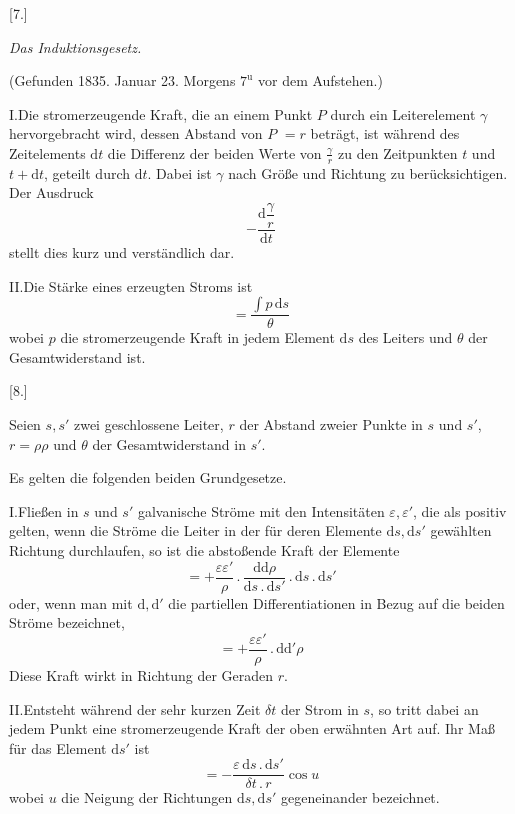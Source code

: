 \begin{center}[7.]\par\medskip\textit{Das Induktionsgesetz.}\par\medskip
{\small (Gefunden 1835. Januar 23. Morgens $7^{\mathrm u}$ vor dem Aufstehen.)}
\end{center}
I.\quad Die stromerzeugende Kraft, die an einem Punkt $P$ durch ein Leiterelement $\gamma$ hervorgebracht wird, dessen Abstand von $P$ $=r$ beträgt, ist während des Zeitelements $\mathrm dt$ die Differenz der beiden Werte von $\frac{\gamma}{r}$ zu den Zeitpunkten $t$ und $t+\mathrm dt$, geteilt durch $\mathrm dt$. Dabei ist $\gamma$ nach Größe und Richtung zu berücksichtigen. Der Ausdruck
\[
-\frac{\mathrm d\dfrac{\gamma}{r}}{\mathrm dt}
\]
stellt dies kurz und verständlich dar.

II.\quad Die Stärke eines erzeugten Stroms ist
\[
=\frac{\int p\,\mathrm ds}{\theta}
\]
wobei $p$ die stromerzeugende Kraft in jedem Element $\mathrm ds$ des Leiters und $\theta$ der Gesamtwiderstand ist.

\begin{center}[8.]\end{center}
Seien $s,s'$ zwei geschlossene Leiter, $r$ der Abstand zweier Punkte in $s$ und $s'$, $r=\rho\rho$ und $\theta$ der Gesamtwiderstand in $s'$.

Es gelten die folgenden beiden Grundgesetze.

I.\quad Fließen in $s$ und $s'$ galvanische Ströme mit den Intensitäten $\varepsilon,\varepsilon'$, die als positiv gelten, wenn die Ströme die Leiter in der für deren Elemente $\mathrm ds,\mathrm ds'$ gewählten Richtung durchlaufen, so ist die abstoßende Kraft der Elemente
\[
=+\frac{\varepsilon\varepsilon'}{\rho}\,.\,\frac{\mathrm d\mathrm d\rho}{\mathrm ds\,.\,\mathrm ds'}\,.\,\mathrm ds\,.\,\mathrm ds'
\]
oder, wenn man mit $\mathrm d,\mathrm d'$ die partiellen Differentiationen in Bezug auf die beiden Ströme bezeichnet,
\[
=+\frac{\varepsilon\varepsilon'}{\rho}\,.\,\mathrm d\mathrm d'\rho
\]
Diese Kraft wirkt in Richtung der Geraden $r$.

\vspace{3mm}
II.\quad Entsteht während der sehr kurzen Zeit $\delta t$ der Strom in $s$, so tritt dabei an jedem Punkt eine stromerzeugende Kraft der oben erwähnten Art auf. Ihr Maß für das Element $\mathrm ds'$ ist
\[
=-\frac{\varepsilon\,\mathrm ds\,.\,\mathrm ds'}{\delta t\,.\,r}\cos u
\]
wobei $u$ die Neigung der Richtungen $\mathrm ds,\mathrm ds'$ gegeneinander bezeichnet.

